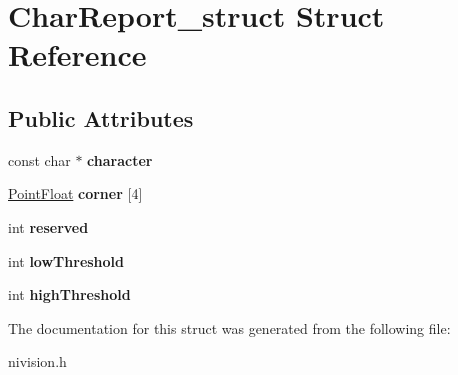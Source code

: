 \hypertarget{structCharReport__struct}{
\section{CharReport\_\-struct Struct Reference}
\label{structCharReport__struct}
}
\subsection*{Public Attributes}
\begin{DoxyCompactItemize}
\item 
\hypertarget{structCharReport__struct_ab83798236c40fc49875a810bfa7d3a3f}{
const char $\ast$ {\bfseries character}}
\label{structCharReport__struct_ab83798236c40fc49875a810bfa7d3a3f}

\item 
\hypertarget{structCharReport__struct_a359ccc16cf1a666156aea955cc70fd12}{
\hyperlink{structPointFloat__struct}{PointFloat} {\bfseries corner} \mbox{[}4\mbox{]}}
\label{structCharReport__struct_a359ccc16cf1a666156aea955cc70fd12}

\item 
\hypertarget{structCharReport__struct_a6c6645a4c360c6136f4f1e32f23e9c2f}{
int {\bfseries reserved}}
\label{structCharReport__struct_a6c6645a4c360c6136f4f1e32f23e9c2f}

\item 
\hypertarget{structCharReport__struct_a4155dbfcf49b01a5f3494631f359720c}{
int {\bfseries lowThreshold}}
\label{structCharReport__struct_a4155dbfcf49b01a5f3494631f359720c}

\item 
\hypertarget{structCharReport__struct_ad50a77433299f11a944bfc029297ed33}{
int {\bfseries highThreshold}}
\label{structCharReport__struct_ad50a77433299f11a944bfc029297ed33}

\end{DoxyCompactItemize}


The documentation for this struct was generated from the following file:\begin{DoxyCompactItemize}
\item 
nivision.h\end{DoxyCompactItemize}
